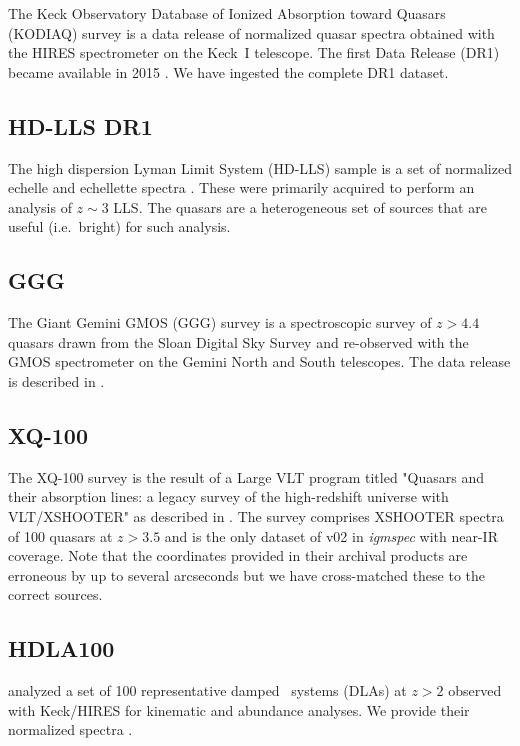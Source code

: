 \documentclass[12pt]{elsarticle}
\begin{document}
The Keck Observatory Database of Ionized Absorption toward 
Quasars (KODIAQ) survey is a data release of normalized
quasar spectra obtained with the HIRES spectrometer 
\citep{vogt94} on the Keck~I telescope. 
The first Data Release (DR1) became available in 2015 
\cite{kodiaq_dr1}. 
We have ingested the complete DR1 dataset.

\subsection{HD-LLS DR1}
\label{sec:hdlls}

The high dispersion Lyman Limit System (HD-LLS) sample is a set of 
normalized echelle and echellette spectra \cite{prochaska+15}.  
These were primarily acquired
to perform an analysis of $z \sim 3$ LLS. 
The quasars are a heterogeneous set of sources that
are useful  (i.e.\ bright) for such analysis. 

\subsection{GGG}
\label{sec:ggg}

The Giant Gemini GMOS (GGG) survey is a spectroscopic survey of 
$z>4.4$ quasars drawn from the Sloan Digital Sky Survey and re-observed with the GMOS spectrometer on the Gemini North and South telescopes. 
The data release is described in \cite{worseck+14}.

\subsection{XQ-100}
\label{sec:xq100}

The XQ-100 survey is the result of a Large VLT program
titled "Quasars and their absorption lines: 
a legacy survey of the high-redshift universe with VLT/XSHOOTER" 
as described in \cite{xq100}.
The survey comprises XSHOOTER spectra of 100 quasars 
at $z>3.5$ and is the only dataset of v02 in {\it igmspec}
with near-IR coverage.
Note that the coordinates provided in their archival products
are erroneous by up to several arcseconds 
but we have cross-matched these to the correct sources.

\subsection{HDLA100}
\label{sec:hdla100}

\cite{marcel13} analyzed a set of 100 representative
damped \lya\ systems
(DLAs) at $z>2$
observed with Keck/HIRES for kinematic and abundance
analyses.  We provide their normalized spectra
\citep[see also][]{pwh+07}.
\end{document}
